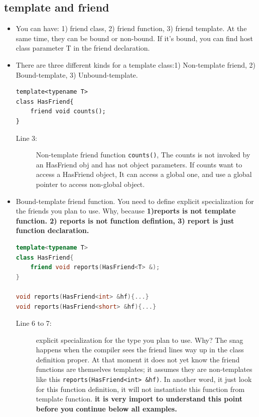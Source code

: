 \documentclass[a4paper,11pt,twoside]{book}
\begin{document}
\subsection{template and friend}
\begin{itemize}
	\item You can have: 1) friend class, 2) friend function, 3) friend template. At the same time, they can be bound or non-bound. If it's bound, you can find host class parameter T in the friend declaration. 
	
	\item  There are three different kinds for a template class:1) Non-template friend, 2) Bound-template, 3) Unbound-template.
\begin{lstlisting}
template<typename T>
class HasFriend{
	friend void counts();
}	
\end{lstlisting}	

	\begin{description}
		\item[Line 3:] Non-template friend function \texttt{counts()}, The counts is not invoked by an HasFriend obj and has not object parameters.  If counts want to access a HasFriend object, It can access a global one, and use a global pointer to access non-global object.
	\end{description}
	
	\item Bound-template friend function. You need to define explicit specialization for the friends you plan to use. Why, because \textbf{1)reports is not template function. 2) reports is not function defintion, 3) report is just function declaration.}
\begin{lstlisting}[frame=single, language=c++]
template<typename T>
class HasFriend{
	friend void reports(HasFriend<T> &);
}

void reports(HasFriend<int> &hf){...}
void reports(HasFriend<short> &hf){...}	
\end{lstlisting}	
	
	\begin{description}
		\item[Line 6 to 7:] explicit specialization for the type you plan to use. Why? The snag happens when the compiler sees the friend lines way up in the class definition proper. At that moment it does not yet know the friend functions are themselves templates; it assumes they are non-templates like this \texttt{reports(HasFriend<int> \&hf)}. In another word, it just look for this function definition, it will not instantiate this function from template function. \textbf{it is very import to understand this point before you continue below all examples.}
	\end{description}
	

\end{itemize}
\end{document}

